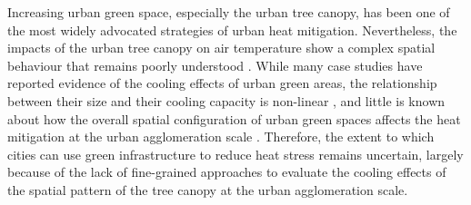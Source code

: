 \documentclass[10pt,letterpaper]{article}
\begin{document}
Increasing urban green space, especially the urban tree canopy, has been one of the most widely advocated strategies of urban heat mitigation. Nevertheless, the impacts of the urban tree canopy on air temperature show a complex spatial behaviour that remains poorly understood \cite{bowler2010urban,phelan2015urban,koc2018evaluating}.
While many case studies have reported evidence of the cooling effects of urban green areas, the relationship between their size and their cooling capacity is non-linear \cite{zardo2017estimating}, and little is known about how the overall spatial configuration of urban green spaces affects the heat mitigation at the urban agglomeration scale \cite{lin2013sharing,jim2013sustainable,haaland2015challenges,artmann2019urban}.
Therefore, the extent to which cities can use green infrastructure to reduce heat stress remains uncertain, largely because of the lack of fine-grained approaches to evaluate the cooling effects of the spatial pattern of the tree canopy at the urban agglomeration scale. %
\end{document}
